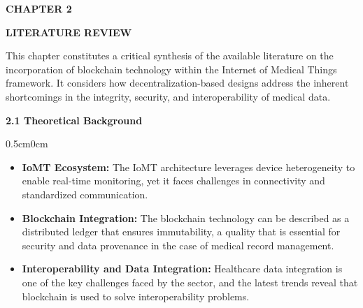\documentclass[12pt, a4paper]{report}
\begin{document}
\newpage

\begin{titlepage}

    \centering
    \vspace*{10cm}
    
    {\color{myblue} \fontsize{30}{36}\selectfont \bfseries CHAPTER 2}
    
    \vspace{1cm}
    
    {\color{myblue} \Huge \bfseries LITERATURE REVIEW}
\end{titlepage}



\newpage
\setlength{\parskip}{1em} 

\noindent This chapter constitutes a critical synthesis of the available literature on the incorporation of blockchain technology within the Internet of Medical Things framework. It considers how decentralization-based designs address the inherent shortcomings in the integrity, security, and interoperability of medical data.

\vspace{0.5cm}
{\color{myblue} \Large \bfseries 2.1	Theoretical Background}
\begin{adjustwidth} {0.5cm}{0cm}
    \vspace{0.1em}
\begin{itemize}[nosep, topsep=0pt, partopsep=0pt]
    \item \textbf{IoMT Ecosystem:} The IoMT architecture leverages device heterogeneity to enable real-time monitoring, yet it faces challenges in connectivity and standardized communication.
    \item \textbf{Blockchain Integration:} The blockchain technology can be described as a distributed ledger that ensures immutability, a quality that is essential for security and data provenance in the case of medical record management.
    \item \textbf{Interoperability and Data Integration:} Healthcare data integration is one of the key challenges faced by the sector, and the latest trends reveal that blockchain is used to solve interoperability problems.
\end{itemize}
\end{adjustwidth}
\end{document}

